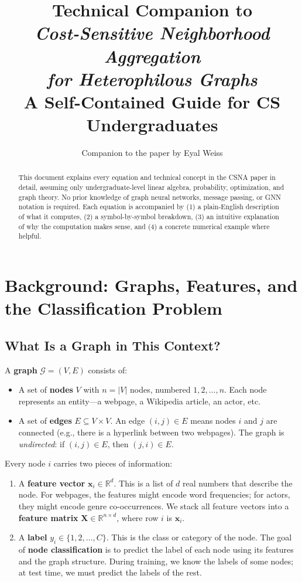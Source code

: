 \documentclass[11pt,a4paper]{article}
\title{\textbf{Technical Companion to}\\[4pt]
\emph{Cost-Sensitive Neighborhood Aggregation\\for Heterophilous Graphs}\\[10pt]
{\large A Self-Contained Guide for CS Undergraduates}}
\author{Companion to the paper by Eyal Weiss}
\date{}
\newcommand{\R}{\mathbb{R}}
\newcommand{\G}{\mathcal{G}}
\newcommand{\bx}{\mathbf{x}}
\theoremstyle{definition}
\theoremstyle{plain}
\begin{document}
\maketitle

\begin{abstract}
This document explains every equation and technical concept in the CSNA paper
in detail, assuming only undergraduate-level linear algebra, probability,
optimization, and graph theory.
No prior knowledge of graph neural networks, message passing, or GNN notation is
required.
Each equation is accompanied by (1) a plain-English description of what it computes,
(2) a symbol-by-symbol breakdown, (3) an intuitive explanation of why the
computation makes sense, and (4) a concrete numerical example where helpful.
\end{abstract}

\tableofcontents
\newpage

\section{Background: Graphs, Features, and the Classification Problem}
\label{sec:background}

\subsection{What Is a Graph in This Context?}

A \textbf{graph} $\G = (V, E)$ consists of:
\begin{itemize}
  \item A set of \textbf{nodes} $V$ with $n = |V|$ nodes, numbered $1, 2, \ldots, n$.
    Each node represents an entity---a webpage, a Wikipedia article, an actor, etc.
  \item A set of \textbf{edges} $E \subseteq V \times V$.
    An edge $(i, j) \in E$ means nodes $i$ and $j$ are connected (e.g., there is
    a hyperlink between two webpages).
    The graph is \emph{undirected}: if $(i,j) \in E$, then $(j,i) \in E$.
\end{itemize}

Every node $i$ carries two pieces of information:

\begin{enumerate}
  \item A \textbf{feature vector} $\bx_i \in \R^d$.
    This is a list of $d$ real numbers that describe the node.
    For webpages, the features might encode word frequencies; for actors, they
    might encode genre co-occurrences.
    We stack all feature vectors into a \textbf{feature matrix}
    $\mathbf{X} \in \R^{n \times d}$, where row $i$ is $\bx_i$.

  \item A \textbf{label} $y_i \in \{1, 2, \ldots, C\}$.
    This is the class or category of the node.
    The goal of \textbf{node classification} is to predict the label of each node
    using its features and the graph structure.
    During training, we know the labels of some nodes; at test time, we must
    predict the labels of the rest.
\end{enumerate}
\end{document}
